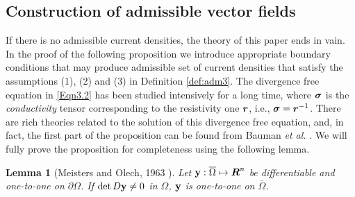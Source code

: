 \documentclass[11pt]{amsart}
\theoremstyle{plain}
\newtheorem{Lem}[Thm]{Lemma}
\numberwithin{equation}{section}
\numberwithin{Thm}{section}
\def\R{\mbox{\boldmath$R$}}
\def\r{{\bf r}}
\def\y{{\bf y}}
\def\Sigma{\mbox{\boldmath$\sigma$}}
\def\r{\mbox{\boldmath$r$}}
\begin{document}
\subsection{Construction of admissible vector fields}\label{sect.cons}

If there is no admissible current densities, the theory of this paper ends in vain. In the proof of the following proposition we introduce appropriate boundary conditions that may produce admissible set of current densities that satisfy the assumptions (1), (2) and (3) in Definition \ref{def:adm3}. The divergence free equation in \eqref{Eqn3.2} has been studied intensively for a long time, where $\Sigma$ is the \emph{conductivity} tensor corresponding to the resistivity one $\r$, i.e., $\Sigma=\r^{-1}$. There are rich theories related to the solution of this divergence free equation, and, in fact, the first part of the proposition can be found from Bauman \emph{et al.} \cite{MR1871388}. We will fully prove the proposition for completeness using the following lemma.


\begin{Lem}[Meisters and Olech, 1963 \cite{meisters_locally_1963}] \label{lemma:bijection} Let $\y:\overline\Omega\mapsto\R^n$ be differentiable and one-to-one on $\partial\Omega$. If $\det D\y \ne0$ in $\Omega$, $\y$ is one-to-one on $\overline\Omega$.
\end{Lem}
\end{document}
